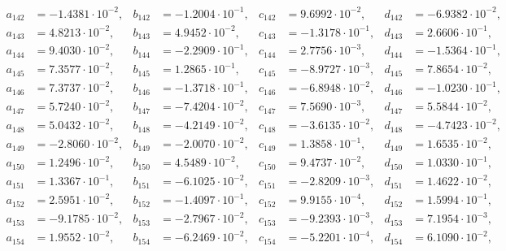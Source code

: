 \begin{align*}
  a_{ 142 } &= -1.4381 \cdot 10^{ -2 }, & b_{ 142 } &= -1.2004 \cdot 10^{ -1 }, & c_{ 142 } &= 9.6992 \cdot 10^{ -2 }, & d_{ 142 } &= -6.9382 \cdot 10^{ -2 }, \\ 
  a_{ 143 } &= 4.8213 \cdot 10^{ -2 }, & b_{ 143 } &= 4.9452 \cdot 10^{ -2 }, & c_{ 143 } &= -1.3178 \cdot 10^{ -1 }, & d_{ 143 } &= 2.6606 \cdot 10^{ -1 }, \\ 
  a_{ 144 } &= 9.4030 \cdot 10^{ -2 }, & b_{ 144 } &= -2.2909 \cdot 10^{ -1 }, & c_{ 144 } &= 2.7756 \cdot 10^{ -3 }, & d_{ 144 } &= -1.5364 \cdot 10^{ -1 }, \\ 
  a_{ 145 } &= 7.3577 \cdot 10^{ -2 }, & b_{ 145 } &= 1.2865 \cdot 10^{ -1 }, & c_{ 145 } &= -8.9727 \cdot 10^{ -3 }, & d_{ 145 } &= 7.8654 \cdot 10^{ -2 }, \\ 
  a_{ 146 } &= 7.3737 \cdot 10^{ -2 }, & b_{ 146 } &= -1.3718 \cdot 10^{ -1 }, & c_{ 146 } &= -6.8948 \cdot 10^{ -2 }, & d_{ 146 } &= -1.0230 \cdot 10^{ -1 }, \\ 
  a_{ 147 } &= 5.7240 \cdot 10^{ -2 }, & b_{ 147 } &= -7.4204 \cdot 10^{ -2 }, & c_{ 147 } &= 7.5690 \cdot 10^{ -3 }, & d_{ 147 } &= 5.5844 \cdot 10^{ -2 }, \\ 
  a_{ 148 } &= 5.0432 \cdot 10^{ -2 }, & b_{ 148 } &= -4.2149 \cdot 10^{ -2 }, & c_{ 148 } &= -3.6135 \cdot 10^{ -2 }, & d_{ 148 } &= -4.7423 \cdot 10^{ -2 }, \\ 
  a_{ 149 } &= -2.8060 \cdot 10^{ -2 }, & b_{ 149 } &= -2.0070 \cdot 10^{ -2 }, & c_{ 149 } &= 1.3858 \cdot 10^{ -1 }, & d_{ 149 } &= 1.6535 \cdot 10^{ -2 }, \\ 
  a_{ 150 } &= 1.2496 \cdot 10^{ -2 }, & b_{ 150 } &= 4.5489 \cdot 10^{ -2 }, & c_{ 150 } &= 9.4737 \cdot 10^{ -2 }, & d_{ 150 } &= 1.0330 \cdot 10^{ -1 }, \\ 
  a_{ 151 } &= 1.3367 \cdot 10^{ -1 }, & b_{ 151 } &= -6.1025 \cdot 10^{ -2 }, & c_{ 151 } &= -2.8209 \cdot 10^{ -3 }, & d_{ 151 } &= 1.4622 \cdot 10^{ -2 }, \\ 
  a_{ 152 } &= 2.5951 \cdot 10^{ -2 }, & b_{ 152 } &= -1.4097 \cdot 10^{ -1 }, & c_{ 152 } &= 9.9155 \cdot 10^{ -4 }, & d_{ 152 } &= 1.5994 \cdot 10^{ -1 }, \\ 
  a_{ 153 } &= -9.1785 \cdot 10^{ -2 }, & b_{ 153 } &= -2.7967 \cdot 10^{ -2 }, & c_{ 153 } &= -9.2393 \cdot 10^{ -3 }, & d_{ 153 } &= 7.1954 \cdot 10^{ -3 }, \\ 
  a_{ 154 } &= 1.9552 \cdot 10^{ -2 }, & b_{ 154 } &= -6.2469 \cdot 10^{ -2 }, & c_{ 154 } &= -5.2201 \cdot 10^{ -4 }, & d_{ 154 } &= 6.1090 \cdot 10^{ -2 }, \\ 

\end{align*}
